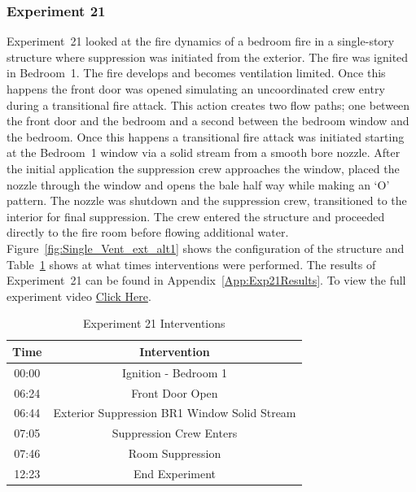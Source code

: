 \documentclass[12pt,oneside]{book}
\begin{document}
\subsubsection{Experiment 21}
Experiment~21 looked at the fire dynamics of a bedroom fire in a single-story structure where suppression was initiated from the exterior. The fire was ignited in Bedroom~1. The fire develops and becomes ventilation limited. Once this happens the front door was opened simulating an uncoordinated crew entry during a transitional fire attack. This action creates two flow paths; one between the front door and the bedroom and a second between the bedroom window and the bedroom. Once this happens a transitional fire attack was initiated starting at the Bedroom~1 window via a solid stream from a smooth bore nozzle. After the initial application the suppression crew approaches the window, placed the nozzle through the window and opens the bale half way while making an `O' pattern. The nozzle was shutdown and the suppression crew, transitioned to the interior for final suppression. The crew entered the structure and proceeded directly to the fire room before flowing additional water. Figure~\ref{fig:Single_Vent_ext_alt1} shows the configuration of the structure and Table~\ref{Table:Exp21Interventions} shows at what times interventions were performed. The results of Experiment~21 can be found in Appendix~\ref{App:Exp21Results}. To view the full experiment video \href{https://player.vimeo.com/video/170499627?autoplay=1}{Click Here}.

\begin{table}[H]
	\centering
	\caption{Experiment 21 Interventions}
	\begin{tabular}{|c|c|} 
		\hline
		Time & Intervention \\ \hline \hline
		00:00 & Ignition - Bedroom 1 \\ \hline
		06:24 & Front Door Open \\ \hline
		06:44 & Exterior Suppression BR1 Window Solid Stream \\ \hline
		07:05 & Suppression Crew Enters\\ \hline
		07:46 & Room Suppression \\ \hline 
		12:23 & End Experiment\\ \hline
	\end{tabular}
	\label{Table:Exp21Interventions}
\end{table}

\FloatBarrier
\end{document}
